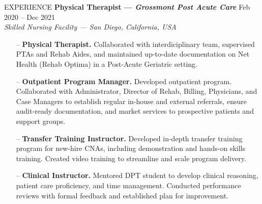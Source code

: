 \documentclass{resume} %
\begin{document}
\begin{rSection}{EXPERIENCE}
\textbf{Physical Therapist --- \textit{Grossmont Post Acute Care}} \hfill Feb 2020 -- Dec 2021\\
\textit{Skilled Nursing Facility --- San Diego, California, USA}
\vspace*{-0.2cm}\begin{itemize}
    \item[--] \textbf{Physical Therapist.} Collaborated with interdiciplinary team, supervised PTAs and Rehab Aides, and maintained up-to-date documentation on Net Health (Rehab Optima) in a Post-Acute Geriatric setting.
    \item[--] \textbf{Outpatient Program Manager.} Developed outpatient program. Collaborated with Administrator, Director of Rehab, Billing, Physicians, and Case Managers to establish regular in-house and external referrals, ensure audit-ready documentation, and market services to prospective patients and support groups.
    \item[--] \textbf{Transfer Training Instructor.} Developed in-depth transfer training program for new-hire CNAs, including demonstration and hands-on skills training. Created video training to streamline and scale program delivery.
    \item[--] \textbf{Clinical Instructor.} Mentored DPT student to develop clinical reasoning, patient care proficiency, and time management. Conducted performance reviews with formal feedback and established plan for improvement.
\end{itemize}



\end{rSection}
\end{document}
